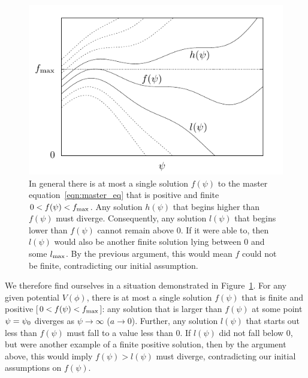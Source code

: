 \begin{figure}[tp]
  \includegraphics[width=\textwidth]{chapters/kinetic_dominance/figures/uschem}
  \caption{In general there is at most a single solution \(f(\psi)\) to the master equation~\protect\eqref{eqn:master_eq} that is positive and finite \(0<f(\psi)<f_\mathrm{max}\). Any solution \(h(\psi)\) that begins higher than \(f(\psi)\) must diverge. Consequently, any solution \(l(\psi)\) that begins lower than \(f(\psi)\) cannot remain above \(0\). If it were able to, then \(l(\psi)\) would also be another finite solution lying between \(0\) and some \(l_{\mathrm{max}}\). By the previous argument, this would mean \(f\) could not be finite, contradicting our initial assumption.\label{fig:figure_uschem}}
\end{figure}
We therefore find ourselves in a situation demonstrated in Figure~\ref{fig:figure_uschem}. For any given potential \(V(\phi)\), there is at most a single solution \(f(\psi)\) that is finite and positive [\(0<f(\psi)<f_\mathrm{max}\)]: any solution that is larger than \(f(\psi)\) at some point \(\psi=\psi_0\) diverges as \(\psi\to\infty\) (\(a\to0\)). Further, any solution \(l(\psi)\) that starts out less than \(f(\psi)\) must fall to a value less than \(0\).  If \(l(\psi)\) did not fall below \(0\), but were another example of a finite positive solution, then by the argument above, this would imply \(f(\psi)>l(\psi)\) must diverge, contradicting our initial assumptions on \(f(\psi)\).

